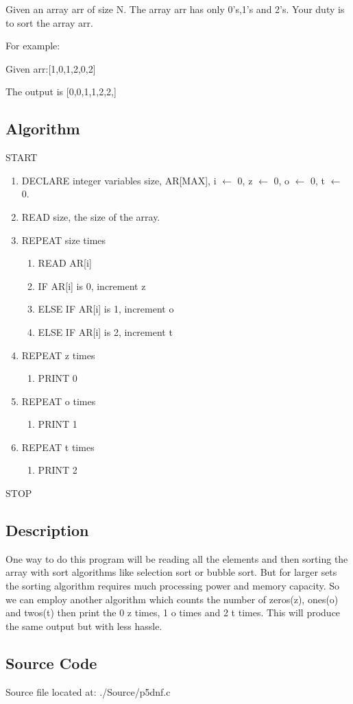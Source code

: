 \documentclass{article}
\begin{document}
Given an array arr of size N. The array arr has only 0's,1's and 2's. Your duty is to sort the array arr.

For example:

Given arr:[1,0,1,2,0,2]

The output is [0,0,1,1,2,2,]
\subsection{Algorithm}
START
\begin{enumerate}
    \item DECLARE integer variables size, AR[MAX], i $\leftarrow$ 0, z $\leftarrow$ 0, o $\leftarrow$ 0, t $\leftarrow$ 0.
    \item READ size, the size of the array.
    \item REPEAT size times 
    \begin{enumerate}
        \item READ AR[i]
        \item IF AR[i] is 0, increment z
        \item ELSE IF AR[i] is 1, increment o
        \item ELSE IF AR[i] is 2, increment t
    \end{enumerate}
    \item REPEAT z times
    \begin{enumerate}
        \item PRINT 0
    \end{enumerate}
    \item REPEAT o times
    \begin{enumerate}
        \item PRINT 1
    \end{enumerate}
    \item REPEAT t times
    \begin{enumerate}
        \item PRINT 2
    \end{enumerate}
\end{enumerate}
STOP
\subsection{Description}
 One way to do this program will be reading all the elements and then sorting the array with sort algorithms like selection sort or bubble sort. But for larger sets the sorting algorithm requires much processing power and memory capacity.\newline
 So we can employ another algorithm which counts the number of zeros(z), ones(o) and twos(t) then print the 0 z times, 1 o times and 2 t times. This will produce the same output but with less hassle.
 \subsection{Source Code}
 Source file located at: ./Source/p5dnf.c
 
\end{document}
